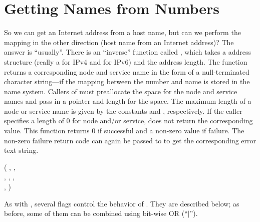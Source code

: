 \section{Getting Names from Numbers}

So we can get an Internet address from a host name, but can we perform
the mapping in the other direction (host name from an Internet
address)?
The answer is ``usually''.
There is an ``inverse'' function called , which
takes a  address structure (really a  for IPv4 and  for IPv6)
and the address length. 
The function returns a corresponding node and service name in the form
of a null-terminated character string---if the mapping between the
number and name is stored in the name system.
%
Callers 
of  must preallocate the space for the node
and service names and pass in a pointer and length for the space.  The maximum
length of a node 
or service name is given by the constants  and
,  
respectively.  If the caller specifies a length of 
0 for node and/or service,  does not return
the corresponding value. 
This function returns 0 if successful and a non-zero value if failure.
The non-zero failure return code can again be passed to
 to 
get the corresponding error text string.

\begin{inlinefcn}
 (
,
 ,\\
\hspace*{1.1in},  ,
 ,\\
\hspace*{1.1in}
, )
\end{inlinefcn}
%
As with ,
several flags control the behavior of 
.  They are described below;
as before, some of them can be combined using bit-wise OR (``$\mid$'').

